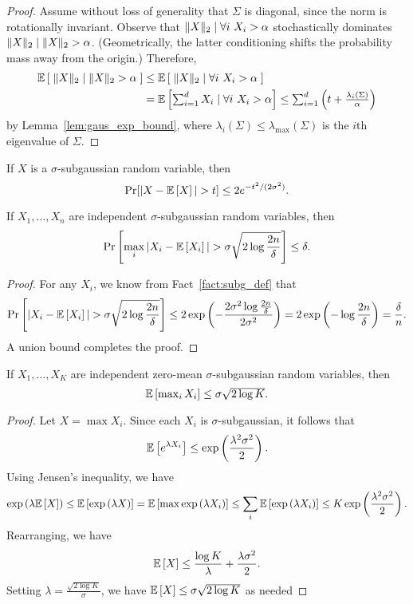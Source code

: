 \begin{proof}
  Assume without loss of generality that $\Sigma$ is diagonal, since the norm is
  rotationally invariant. Observe that
    $\|X\|_2 \;|\; \forall i ~ X_i > \alpha$
  stochastically dominates $\|X\|_2 \;|\; \|X\|_2 > \alpha$.
  (Geometrically, the latter conditioning shifts the probability mass away from the origin.)
  Therefore,
  \begin{align*}
    \mathbb{E}\left[\; \|X\|_2 \;|\; \|X\|_2 > \alpha \;\right]
    &\le \mathbb{E}\left[\; \|X\|_2 \;|\; \forall i ~ X_i > \alpha \;\right] \\
    &= \textstyle  \mathbb{E}\left[\sum_{i=1}^d X_i \;|\; \forall i ~ X_i > \alpha\right]
    \le \sum_{i=1}^d \left(t+ \frac{\lambda_i(\Sigma)}{\alpha}\right)
  \end{align*}
  by Lemma~\ref{lem:gaus_exp_bound}, where
    $\lambda_i(\Sigma) \leq \lambda_{\max}(\Sigma)$ is the $i$th
  eigenvalue of $\Sigma$.
\end{proof}


\begin{fact}
  If $X$ is a $\sigma$-subgaussian random variable, then
  \[
    \Pr[|X-\mathbb{E}\left[X\right]| > t] \le 2e^{-t^2/(2\sigma^2)}.
  \]
  \label{fact:subg_def}
\end{fact}

\begin{lemma}
  If $X_1, \dots, X_n$ are independent $\sigma$-subgaussian random variables, then
  \begin{align*}
    \Pr\left[\max_i |X_i-\mathbb{E}\left[X_i\right]| > \sigma\sqrt{2\log\frac{2n}{\delta}}\right] \le \delta.
  \end{align*}
  \label{lem:subg_union_bound}
\end{lemma}
\begin{proof}
  For any $X_i$, we know from Fact~\ref{fact:subg_def} that
  \[
    \Pr\left[|X_i - \mathbb{E}\left[X_i\right]| > \sigma \sqrt{2 \log \frac{2n}{\delta}}\right]
    \le 2\exp\left(-\frac{2\sigma^2 \log \frac{2n}{\delta}}{2\sigma^2}\right)
    = 2\exp\left(-\log \frac{2n}{\delta}\right)
    = \frac{\delta}{n}.
  \]
  A union bound completes the proof.
\end{proof}
\begin{lemma}
  If $X_1, \dots, X_K$ are independent zero-mean $\sigma$-subgaussian random variables, then
  \[
    \textstyle \mathbb{E}\left[\max_i X_i\right] \le \sigma \sqrt{2 \log K}.
  \]
  \label{lem:subgaussian_max}
\end{lemma}
\begin{proof}
Let $X = \max X_i$. Since each $X_i$ is $\sigma$-subgaussian, it follows that
  \[
    \mathbb{E}\left[e^{\lambda X_i}\right] \le \exp\left(\frac{\lambda^2 \sigma^2}{2}\right).
  \]
  Using Jensen's inequality, we have
  \[
    \exp\left(\lambda\mathbb{E}\left[X\right]\right) \le \mathbb{E}\left[\exp\left(\lambda X\right)\right] = \mathbb{E}\left[\max \exp\left(\lambda
    X_i\right)\right] \le \sum_{i} \mathbb{E}\left[\exp\left(\lambda X_i\right)\right] \le K \exp\left(\frac{\lambda^2
    \sigma^2}{2}\right).
  \]
  Rearranging, we have
  \[
    \mathbb{E}\left[X\right] \le \frac{\log K}{\lambda} + \frac{\lambda \sigma^2}{2}.
  \]
  Setting $\lambda = \frac{\sqrt{2 \log K}}{\sigma}$, we have
  $  \mathbb{E}\left[X\right] \le \sigma \sqrt{2 \log K}$ as needed
\end{proof}


